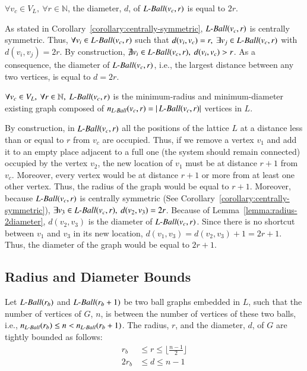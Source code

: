 \begin{lem}
	\label{lemma:radius-2diameter}
	$\forall v_c \in V_L,\ \forall r \in \mathbb{N}$, the diameter, $d$, of $\mathop{L{\textnormal{-}Ball}}(v_c,r)$ is equal to $2r$.
\end{lem}

\begin{pf}
	As stated in Corollary~\ref{corollary:centrally-symmetric}, $\mathop{L{\textnormal{-}Ball}}(v_c,r)$ is centrally symmetric. Thus, $\forall v_i \in \mathop{L{\textnormal{-}Ball}}(v_c,r)$ such that $d(v_i, v_c) = r,\ \exists v_j \in \mathop{L{\textnormal{-}Ball}}(v_c,r)$ with $d(v_i,v_j) = 2 r$. By construction, $\nexists v_i \in \mathop{L{\textnormal{-}Ball}}(v_c,r),\ d(v_i,v_c) > r$. As a consequence, the diameter of $\mathop{L{\textnormal{-}Ball}}(v_c,r)$, i.e., the largest distance between any two vertices, is equal to $d = 2 r$.
\end{pf}

\begin{cor}
	\label{corollary:radius-size}
	$\forall v_c \in V_L,\ \forall r \in \mathbb{N},\ \mathop{L{\textnormal{-}Ball}}(v_c,r)$ is the minimum-radius and minimum-diameter existing graph composed of $n_{\mathop{L{\textnormal{-}Ball}}}(v_c,r) = |\mathop{L{\textnormal{-}Ball}}(v_c,r)|$ vertices in $L$.
\end{cor}

\begin{pf}
	By construction, in $\mathop{L{\textnormal{-}Ball}}(v_c,r)$ all the positions of the lattice $L$ at a distance less than or equal to $r$ from $v_c$ are occupied. Thus, if we remove a vertex $v_1$ and add it to an empty place adjacent to a full one (the system should remain connected) occupied by the vertex $v_2$, the new location of $v_1$ must be at distance $r+1$ from $v_c$. Moreover, every vertex would be at distance $r+1$ or more from at least one other vertex. Thus, the radius of the graph would be equal to $r+1$.
	Moreover, because $\mathop{L{\textnormal{-}Ball}}(v_c,r)$ is centrally symmetric (See Corollary~\ref{corollary:centrally-symmetric}), $\exists v_3 \in \mathop{L{\textnormal{-}Ball}}(v_c,r),\ d(v_2,v_3) = 2 r$. Because of Lemma~\ref{lemma:radius-2diameter}, $d(v_2,v_3)$ is the diameter of $\mathop{L{\textnormal{-}Ball}}(v_c,r)$. Since there is no shortcut between $v_1$ and $v_3$ in its new location, $d(v_1,v_3) =  d(v_2,v_3) + 1 = 2 r + 1$. Thus, the diameter of the graph would be equal to $2 r + 1$.
\end{pf}

\subsection{Radius and Diameter Bounds}

\begin{thm}
	\label{theorem:radius}
	\assumptions{} Let $\mathop{L{\textnormal{-}Ball}}(r_b)$ and $\mathop{L{\textnormal{-}Ball}}(r_b + 1)$ be two ball graphs embedded in $L$, such that the number of vertices of $G$, $n$, is between the number of vertices of these two balls, i.e.,  $n_{\mathop{L{\textnormal{-}Ball}}}(r_b) \leq n < n_{\mathop{L{\textnormal{-}Ball}}}(r_b+1)$. The radius, $r$, and the diameter, $d$, of $G$ are tightly bounded as follows:
	\begin{align} \label{eq:radius-diameter-bounds}
	r_b & \leq r \leq \lfloor \frac{n-1}{2} \rfloor\\
	2 r_b & \leq d \leq n-1
	\end{align}
\end{thm}

